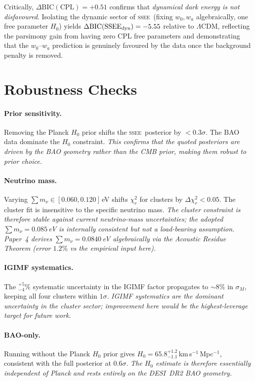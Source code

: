 \documentclass[12pt,a4paper]{article}
\newcommand{\SSEE}{\ifmmode\mathrm{SSEE}\else\textsc{ssee}\fi}
\newcommand{\LCDM}{\ifmmode\Lambda\mathrm{CDM}\else$\Lambda$CDM\fi}
\newcommand{\wz}{w_0}
\newcommand{\wa}{w_a}
\begin{document}
Critically, $\Delta\mathrm{BIC}(\mathrm{CPL})=+0.51$ confirms that
\textit{dynamical dark energy is not disfavoured}. Isolating the dynamic
sector of \SSEE\ (fixing $\wz,\wa$ algebraically, one free parameter $H_0$)
yields $\Delta\mathrm{BIC}(\SSEE_{\rm dyn})=-5.55$ relative to \LCDM,
reflecting the parsimony gain from having zero CPL free parameters and
demonstrating that the $\wz$--$\wa$ prediction is genuinely favoured by
the data once the background penalty is removed.

\section{Robustness Checks}
\label{sec:robustness}

\paragraph{Prior sensitivity.}
Removing the Planck $H_0$ prior shifts the \SSEE\ posterior by
$<0.3\sigma$. The BAO data dominate the $H_0$ constraint.
\textit{This confirms that the quoted posteriors are driven by the BAO
geometry rather than the CMB prior, making them robust to prior choice.}

\paragraph{Neutrino mass.}
Varying $\sum m_\nu\in[0.060,0.120]$\,eV shifts $\chi^2_r$ for
clusters by $\Delta\chi^2_r<0.05$. The cluster fit is insensitive
to the specific neutrino mass.
\textit{The cluster constraint is therefore stable against current
neutrino-mass uncertainties; the adopted $\sum m_\nu=0.085$\,eV is
internally consistent but not a load-bearing assumption.
Paper~4 derives $\sum m_\nu = 0.0840$\,eV algebraically via the
Acoustic Residue Theorem (error $1.2\%$ vs the empirical input here).}

\paragraph{IGIMF systematics.}
The $^{+5}_{-4}\%$ systematic uncertainty in the IGIMF factor
\citep{Zhang2026} propagates to $\sim8\%$ in $\sigma_M$, keeping
all four clusters within $1\sigma$.
\textit{IGIMF systematics are the dominant uncertainty in the cluster
sector; improvement here would be the highest-leverage target for
future work.}

\paragraph{BAO-only.}
Running without the Planck $H_0$ prior gives
$H_0=65.8^{+1.2}_{-1.1}$\,km\,s$^{-1}$\,Mpc$^{-1}$, consistent
with the full posterior at $0.6\sigma$.
\textit{The $H_0$ estimate is therefore essentially independent of
Planck and rests entirely on the DESI~DR2 BAO geometry.}
\end{document}
